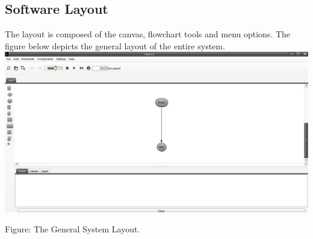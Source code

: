 \documentclass[11pt,a4paper,titlepage]{article}
\begin{document}
		
		
		
		
		\subsection{Software Layout}
		The layout is composed of the canvas, flowchart tools and menu options. \newline 
		The figure below depicts the general layout of the entire system. \newline \newline
		\includegraphics[width=\textwidth]{SystemLayout.jpg}
		\begin{center}
		Figure: The General System Layout.\newline
		\end{center}
		
\end{document}
